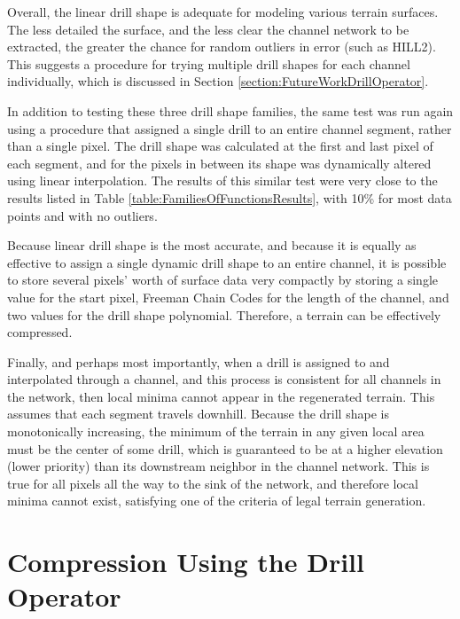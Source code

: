Overall, the linear drill shape is adequate for modeling various terrain surfaces. The less detailed the surface, and the less clear the channel network to be extracted, the greater the chance for random outliers in error (such as HILL2). This suggests a procedure for trying multiple drill shapes for each channel individually, which is discussed in Section \ref{section:FutureWorkDrillOperator}.


In addition to testing these three drill shape families, the same test was run again using a procedure that assigned a single drill to an entire channel segment, rather than a single pixel. The drill shape was calculated at the first and last pixel of each segment, and for the pixels in between its shape was dynamically altered using linear interpolation. The results of this similar test were very close to the results listed in Table \ref{table:FamiliesOfFunctionsResults}, with 10\% for most data points and with no outliers. 

Because linear drill shape is the most accurate, and because it is equally as effective to assign a single dynamic drill shape to an entire channel, it is possible to store several pixels' worth of surface data very compactly by storing a single value for the start pixel, Freeman Chain Codes for the length of the channel, and two values for the drill shape polynomial. Therefore, a terrain can be effectively compressed. 

Finally, and perhaps most importantly, when a drill is assigned to and interpolated through a channel, and this process is consistent for all channels in the network, then local minima cannot appear in the regenerated terrain. This assumes that each segment travels downhill. Because the drill shape is monotonically increasing, the minimum of the terrain in any given local area must be the center of some drill, which is guaranteed to be at a higher elevation (lower priority) than its downstream neighbor in the channel network. This is true for all pixels all the way to the sink of the network, and therefore local minima cannot exist, satisfying one of the criteria of legal terrain generation.

\section{Compression Using the Drill Operator}
\label{section:TerrainCompression}

